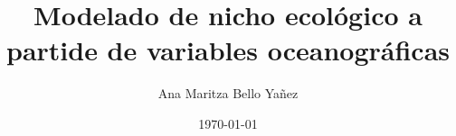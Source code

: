 \documentclass[12pt,letterpaper]{book}%
\begin{document}
\author{Ana Maritza Bello Yañez} 
\title{Modelado de nicho ecológico a partide de variables oceanográficas} 
\date{\today} 







\mainmatter
\setcounter{chapter}{0}
\setcounter{page}{0}
\setcounter{secnumdepth}{4}





\backmatter 

\pagebreak
 

\end{document}
